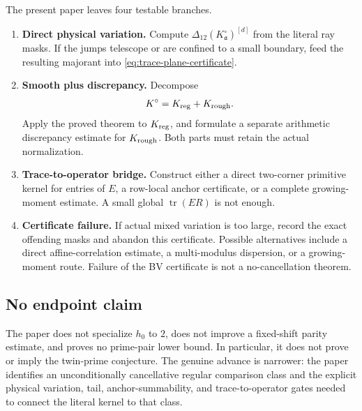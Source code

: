 The present paper leaves four testable branches.
\begin{enumerate}[label=\textup{(\Roman*)}]
 \item \textbf{Direct physical variation.}  Compute
 \(\Delta_{12}(K^\circ_{\mathfrak a})^{[d]}\) from the literal ray masks.
 If the
 jumps telescope or are confined to a small boundary, feed the resulting
 majorant into \eqref{eq:trace-plane-certificate}.
 \item \textbf{Smooth plus discrepancy.}  Decompose
 \[
 K^\circ=K_{\rm reg}+K_{\rm rough}.
 \]
 Apply the proved theorem to \(K_{\rm reg}\), and formulate a separate
 arithmetic discrepancy estimate for \(K_{\rm rough}\).  Both parts must
 retain the actual normalization.
 \item \textbf{Trace-to-operator bridge.}  Construct either a direct
 two-corner primitive kernel for entries of \(E\), a row-local anchor
 certificate, or a complete growing-moment estimate.  A small global
 \(\operatorname{tr}(ER)\) is not enough.
 \item \textbf{Certificate failure.}  If actual mixed variation is too
 large, record the exact offending masks and abandon this certificate.
 Possible alternatives include a direct affine-correlation estimate,
 a multi-modulus dispersion, or a growing-moment route.  Failure of the
 BV certificate is not a no-cancellation theorem.
\end{enumerate}

\subsection{No endpoint claim}

The paper does not specialize \(h_0\) to \(2\), does not improve a
fixed-shift parity estimate, and proves no prime-pair lower bound.  In
particular, it does not prove or imply the twin-prime conjecture.  The
genuine advance is narrower: the paper identifies an unconditionally
cancellative regular comparison class and the explicit physical variation,
tail, anchor-summability, and trace-to-operator gates needed to connect the
literal kernel to that class.
